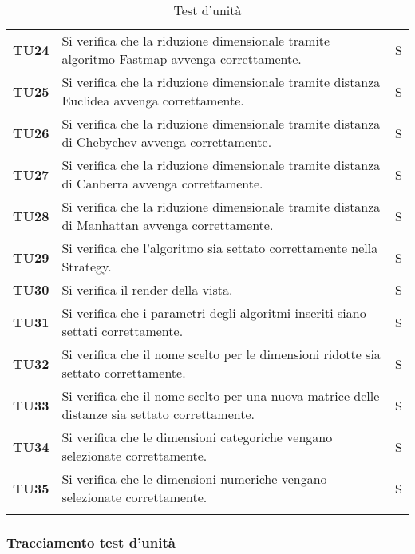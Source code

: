 {\begin{longtable}{ C{1.5cm} | C{12cm}| C{1.5cm} }
\textbf{TU24} & 
Si verifica che la riduzione dimensionale tramite algoritmo Fastmap avvenga correttamente. & 
S\\

\textbf{TU25} & 
Si verifica che la riduzione dimensionale tramite distanza Euclidea avvenga correttamente. & 
S\\

\textbf{TU26} & 
Si verifica che la riduzione dimensionale tramite distanza di Chebychev avvenga correttamente. & 
S\\

\textbf{TU27} & 
Si verifica che la riduzione dimensionale tramite distanza di Canberra avvenga correttamente. & 
S\\

\textbf{TU28} & 
Si verifica che la riduzione dimensionale tramite distanza di Manhattan avvenga correttamente. & 
S\\

\textbf{TU29} & 
Si verifica che l'algoritmo sia settato correttamente nella Strategy. & 
S\\

\textbf{TU30} & 
Si verifica il render della vista. & 
S\\

\textbf{TU31} & 
Si verifica che i parametri degli algoritmi inseriti siano settati correttamente. & 
S\\

\textbf{TU32} & 
Si verifica che il nome scelto per le dimensioni ridotte sia settato correttamente. & 
S\\

\textbf{TU33} & 
Si verifica che il nome scelto per una nuova matrice delle distanze sia settato correttamente. & 
S\\

\textbf{TU34} & 
Si verifica che le dimensioni categoriche vengano selezionate correttamente. & 
S\\

\textbf{TU35} & 
Si verifica che le dimensioni numeriche vengano selezionate correttamente. & 
S\\

\caption{Test d'unità}
\label{testIntegrazione}
\end{longtable}
}

\newpage

\subsubsection{Tracciamento test d'unità}

